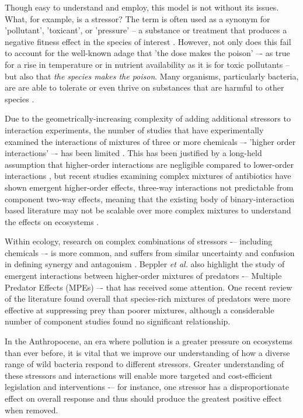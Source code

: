 \documentclass[final,1p,times]{elsarticle}
\begin{document}
Though easy to understand and employ, this model is not without its issues. What, for example, is a stressor? The term is often used as a synonym for 'pollutant', 'toxicant', or 'pressure' -- a substance or treatment that produces a negative fitness effect in the species of interest \cite{Piggott2015}. However, not only does this fail to account for the well-known adage that 'the dose makes the poison'\cite{OGParacelsus} –- as true for a rise in temperature or in nutrient availability as it is for toxic pollutants -- but also that \textit{the species makes the poison}. Many organisms, particularly bacteria, are are able to tolerate or even thrive on substances that are harmful to other species \cite{Malik2004,Gadd2009}. 

Due to the geometrically-increasing complexity of adding additional stressors to interaction experiments, the number of studies that have experimentally examined the interactions of mixtures of three or more chemicals –- 'higher order interactions' –- has been limited \cite{Beppler2016UncoveringStressors}. This has been justified by a long-held assumption that higher-order interactions are negligible compared to lower-order interactions \cite{Tekin2017PrevalenceInteractions}, but recent studies examining complex mixtures of antibiotics have shown emergent higher-order effects,  three-way interactions not predictable from component two-way effects, meaning that the existing body of binary-interaction based literature may not be scalable over more complex mixtures to understand the effects on ecosystems \cite{Tekin2016, Zimmer2016, Tekin2017}.

Within ecology, research on complex combinations of stressors -– including chemicals –- is more common, and suffers from similar uncertainty and confusion in defining synergy and antagonism \cite{Cote2016}.  Beppler \textit{et al.} also highlight the study of emergent interactions between higher-order mixtures of predators -– Multiple Predator Effects (MPEs) –- that has received some attention. One recent review of the literature \cite{Griffin2013EffectsMeta-analysis} found overall that species-rich mixtures of predators were more effective at suppressing prey than poorer mixtures, although a considerable number of component studies found no significant relationship. 

In the Anthropocene, an era where pollution is a greater pressure on ecosystems than ever before, it is vital that we improve our understanding of how a diverse range of wild bacteria respond to different stressors. Greater understanding of these stressors and interactions will enable more targeted and cost-efficient legislation and interventions -– for instance, one stressor has a disproportionate effect on overall response and thus should produce the greatest positive effect when removed. 
\end{document}
